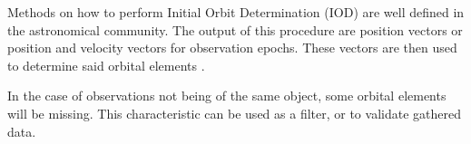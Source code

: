 	Methods on how to perform Initial Orbit Determination (IOD) are well defined in the astronomical community. The output of this procedure are position vectors or position and velocity vectors for observation epochs. These vectors are then used to determine said orbital elements \citep{montenbruck2005satellite}.
	
	In the case of observations not being of the same object, some orbital elements will be missing. This characteristic can be used as a filter, or to validate gathered data.